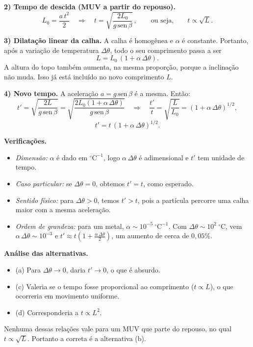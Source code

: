 \documentclass{article}%
\begin{document}
\textbf{2) Tempo de descida (MUV a partir do repouso).}
\[
L_0 = \frac{a\,t^2}{2} \quad\Longrightarrow\quad t = \sqrt{\frac{2L_0}{g\,\text{sen}\,\beta}}\,, \qquad\text{ou seja,}\qquad t \propto \sqrt{L} .
\]

\textbf{3) Dilatação linear da calha.} A calha é homogênea e $\alpha$ é constante. Portanto, após a variação de temperatura $\Delta\theta$, todo o seu comprimento passa a ser
\[
L = L_0\,(1+\alpha\,\Delta\theta).
\]
A altura do topo também aumenta, na mesma proporção, porque a inclinação não muda. Isso já está incluído no novo comprimento $L$.

\textbf{4) Novo tempo.} A aceleração $a = g\,\text{sen}\,\beta$ é a mesma. Então:
\[
t' = \sqrt{\frac{2L}{g\,\text{sen}\,\beta}} = \sqrt{\frac{2L_0(1+\alpha\,\Delta\theta)}{g\,\text{sen}\,\beta}}
\quad\Longrightarrow\quad
\frac{t'}{t} = \sqrt{\frac{L}{L_0}} = (1+\alpha\,\Delta\theta)^{1/2},
\]
\[
\boxed{t' = t\,(1+\alpha\,\Delta\theta)^{1/2}} .
\]

\textbf{Verificações.}
\begin{itemize}
\item \emph{Dimensão:} $\alpha$ é dado em ${}^\circ\text{C}^{-1}$, logo $\alpha\,\Delta\theta$ é adimensional e $t'$ tem unidade de tempo.
\item \emph{Caso particular:} se $\Delta\theta = 0$, obtemos $t' = t$, como esperado.
\item \emph{Sentido físico:} para $\Delta\theta > 0$, temos $t' > t$, pois a partícula percorre uma calha maior com a mesma aceleração.
\item \emph{Ordem de grandeza:} para um metal, $\alpha \sim 10^{-5}\ {}^\circ\text{C}^{-1}$. Com $\Delta\theta \sim 10^{2}\ {}^\circ\text{C}$, vem $\alpha\,\Delta\theta \sim 10^{-3}$ e $t' \approx t\left(1 + \tfrac{\alpha\,\Delta\theta}{2}\right)$, um aumento de cerca de $0{,}05\%$.
\end{itemize}

\textbf{Análise das alternativas.}
\begin{itemize}
\item (a) Para $\Delta\theta \to 0$, daria $t' \to 0$, o que é absurdo.
\item (c) Valeria se o tempo fosse proporcional ao comprimento ($t \propto L$), o que ocorreria em movimento uniforme.
\item (d) Corresponderia a $t \propto L^2$.
\end{itemize}
Nenhuma dessas relações vale para um MUV que parte do repouso, no qual $t \propto \sqrt{L}$. Portanto a correta é a alternativa (b).
\end{document}
